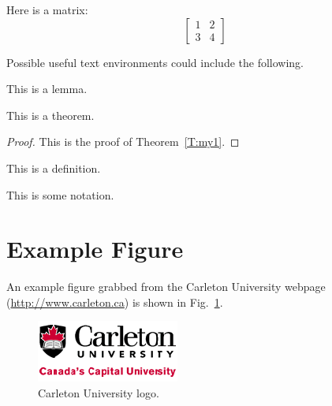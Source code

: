 \documentclass[12pt]{report}
\begin{document}
Here is a matrix:
$$
\left[ \begin{matrix} 1 & 2 \\ 3 & 4 \end{matrix} \right]
$$


Possible useful text environments could include the following.

\begin{lemma} 
This is a lemma.
\end{lemma}

\begin{theorem} \label{T:my1}
This is a theorem.
\end{theorem}


\begin{proof}
This is the proof of Theorem~\ref{T:my1}.
\end{proof}


\begin{definition}
This is a definition.
\end{definition}

\begin{notation}
This is some notation.
\end{notation}


\section{Example Figure}

An example figure grabbed from the Carleton University webpage (\url{http://www.carleton.ca}) is shown in Fig.~\ref{fig-culogo}.
  \begin{figure}[hbt]
   \begin{center}
     \includegraphics{cu_logo.png}
   \end{center}
  \caption{Carleton University logo.}
  \label{fig-culogo}
  \end{figure}
  

\end{document}
